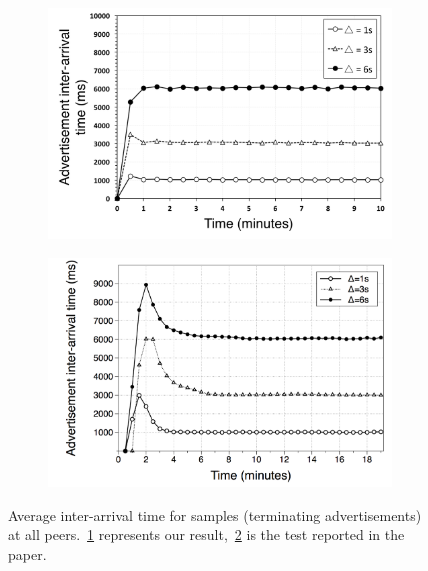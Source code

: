 \begin{figure}
\centering
\begin{subfigure}{.5\textwidth}
  \centering
  \includegraphics[keepaspectratio=true, width=1\linewidth]{images/average_interarrivaltime}
  \caption{}
  \label{fig:average_interarrivaltime}
\end{subfigure}%
\begin{subfigure}{.5\textwidth}
  \centering
  \includegraphics[keepaspectratio=true, width=1\linewidth]{images/paper_average_interarrivaltime}
  \caption{}
  \label{fig:paper_average_interarrivaltime}
\end{subfigure}
\caption{Average inter-arrival time for samples (terminating advertisements) at all peers.~\ref{fig:average_interarrivaltime} represents our result,~\ref{fig:paper_average_interarrivaltime} is the test reported in the paper.}
\label{fig:ad_average_interarrivaltime}
\end{figure}



